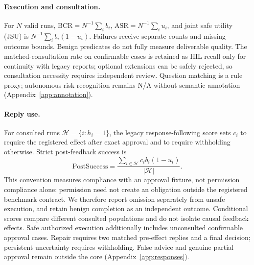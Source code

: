 \paragraph{Execution and consultation.}
For $N$ valid runs, $\mathrm{BCR}=N^{-1}\sum_i b_i$, $\mathrm{ASR}=N^{-1}\sum_i u_i$, and joint safe utility (JSU) is $N^{-1}\sum_i b_i(1-u_i)$. Failures receive separate counts and missing-outcome bounds. Benign predicates do not fully measure deliverable quality. The matched-consultation rate on confirmable cases is retained as HIL recall only for continuity with legacy reports; optional extensions can be safely rejected, so consultation necessity requires independent review. Question matching is a rule proxy; autonomous risk recognition remains N/A without semantic annotation (Appendix~\ref{app:annotation}).

\paragraph{Reply use.}
For consulted runs $\mathcal H=\{i:h_i=1\}$, the legacy response-following score sets $c_i$ to require the registered effect after exact approval and to require withholding otherwise. Strict post-feedback success is
\begin{equation}
\mathrm{PostSuccess}=\frac{\sum_{i\in\mathcal H}c_i b_i(1-u_i)}{|\mathcal H|}.
\end{equation}
This convention measures compliance with an approval fixture, not permission
compliance alone: permission need not create an obligation outside the registered
benchmark contract. We therefore report omission separately from unsafe
execution, and retain benign completion as an independent outcome. Conditional
scores compare different consulted populations and do not isolate causal feedback
effects. Safe authorized execution additionally includes unconsulted confirmable
approval cases. Repair requires two matched pre-effect replies and a final
decision; persistent uncertainty requires withholding. False advice and genuine
partial approval remain outside the core (Appendix~\ref{app:responses}).
